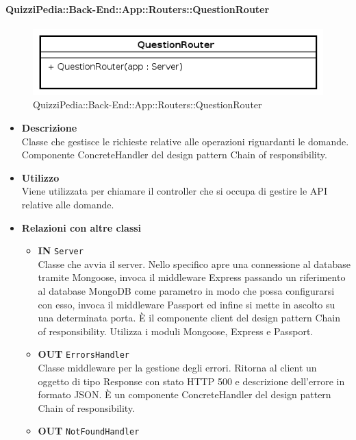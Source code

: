 \paragraph{QuizziPedia::Back-End::App::Routers::QuestionRouter}
\begin{figure}[ht]
	\centering
	\includegraphics[scale=0.45]{UML/Package/QuizziPedia_Back-End_App_Routers_questionRouter.png}
	\caption{QuizziPedia::Back-End::App::Routers::QuestionRouter}
\end{figure}
\FloatBarrier
	\begin{itemize}
		\item \textbf{Descrizione} \\
		Classe che gestisce le richieste relative alle operazioni riguardanti le domande. Componente ConcreteHandler del design pattern Chain of responsibility.
		\item \textbf{Utilizzo} \\
		Viene utilizzata per chiamare il controller che si occupa di gestire le API relative alle domande.
		\item \textbf{Relazioni con altre classi} \\
		\begin{itemize}
			\item \textbf{IN} \texttt{Server}\\
			Classe che avvia il server. Nello specifico apre una connessione al database tramite Mongoose, invoca il middleware Express passando un riferimento al database MongoDB come parametro in modo che possa configurarsi con esso, invoca il middleware Passport ed infine si mette in ascolto su una determinata porta. È il componente client del design pattern Chain of responsibility. Utilizza i moduli Mongoose, Express e Passport.
			\item \textbf{OUT} \texttt{ErrorsHandler}\\
			Classe middleware per la gestione degli errori. Ritorna al client un oggetto di tipo Response con stato HTTP 500 e descrizione dell'errore in formato JSON. È un componente ConcreteHandler del design pattern Chain of responsibility.
			\item \textbf{OUT} \texttt{NotFoundHandler}\\

\end{itemize}
\end{itemize}
